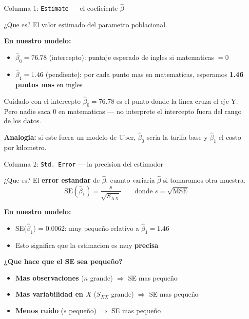 \documentclass[aspectratio=169, 11pt]{beamer}
\begin{document}
\begin{frame}{Columna 1: \texttt{Estimate} --- el coeficiente $\hat{\beta}$}
\small
\begin{block}{¿Que es?}
El valor estimado del parametro poblacional.
\end{block}

\vspace{0.2cm}
\textbf{En nuestro modelo:}
\begin{itemize}\setlength{\itemsep}{3pt}
  \item $\hat{\beta}_0 = 76.78$ (intercepto): puntaje esperado de ingles si matematicas $= 0$
  \item $\hat{\beta}_1 = 1.46$ (pendiente): por cada punto mas en matematicas, esperamos \textbf{1.46 puntos mas} en ingles
\end{itemize}

\vspace{0.2cm}
\begin{alertblock}{Cuidado con el intercepto}
\small $\hat{\beta}_0 = 76.78$ es el punto donde la linea cruza el eje Y. Pero nadie saca 0 en matematicas --- no interprete el intercepto fuera del rango de los datos.
\end{alertblock}

\vspace{0.2cm}
\textbf{Analogia:} si este fuera un modelo de Uber, $\hat{\beta}_0$ seria la tarifa base y $\hat{\beta}_1$ el costo por kilometro.
\end{frame}

\begin{frame}{Columna 2: \texttt{Std.\ Error} --- la precision del estimador}
\small
\begin{block}{¿Que es?}
El \textbf{error estandar} de $\hat{\beta}$: cuanto variaria $\hat{\beta}$ si tomaramos otra muestra.
\[
\text{SE}(\hat{\beta}_1) = \frac{s}{\sqrt{S_{XX}}} \qquad \text{donde } s = \sqrt{\text{MSE}}
\]
\end{block}

\vspace{0.2cm}
\textbf{En nuestro modelo:}
\begin{itemize}
  \item SE($\hat{\beta}_1$) = 0.0062: muy peque\~no relativo a $\hat{\beta}_1 = 1.46$
  \item Esto significa que la estimacion es muy \textbf{precisa}
\end{itemize}

\vspace{0.2cm}
\textbf{¿Que hace que el SE sea peque\~no?}
\begin{itemize}\setlength{\itemsep}{1pt}
  \item \textbf{Mas observaciones} ($n$ grande) $\Rightarrow$ SE mas peque\~no
  \item \textbf{Mas variabilidad en $X$} ($S_{XX}$ grande) $\Rightarrow$ SE mas peque\~no
  \item \textbf{Menos ruido} ($s$ peque\~no) $\Rightarrow$ SE mas peque\~no
\end{itemize}
\end{frame}
\end{document}
